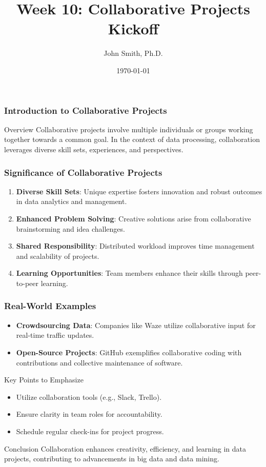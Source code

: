 \documentclass[aspectratio=169]{beamer}
\title[Collaborative Projects]{Week 10: Collaborative Projects Kickoff}
\subtitle{}
\author[J. Smith]{John Smith, Ph.D.}
\institute[University Name]{
  Department of Computer Science\\
  University Name\\
  \vspace{0.3cm}
  Email: email@university.edu\\
  Website: www.university.edu
}
\date{\today}
\begin{document}
\frame{\titlepage}

\begin{frame}[fragile]
    \frametitle{Introduction to Collaborative Projects}
    \begin{block}{Overview}
        Collaborative projects involve multiple individuals or groups working together towards a common goal. In the context of data processing, collaboration leverages diverse skill sets, experiences, and perspectives.
    \end{block}
\end{frame}

\begin{frame}[fragile]
    \frametitle{Significance of Collaborative Projects}
    \begin{enumerate}
        \item \textbf{Diverse Skill Sets}: Unique expertise fosters innovation and robust outcomes in data analytics and management.
        \item \textbf{Enhanced Problem Solving}: Creative solutions arise from collaborative brainstorming and idea challenges.
        \item \textbf{Shared Responsibility}: Distributed workload improves time management and scalability of projects.
        \item \textbf{Learning Opportunities}: Team members enhance their skills through peer-to-peer learning.
    \end{enumerate}
\end{frame}

\begin{frame}[fragile]
    \frametitle{Real-World Examples}
    \begin{itemize}
        \item \textbf{Crowdsourcing Data}: Companies like Waze utilize collaborative input for real-time traffic updates.
        \item \textbf{Open-Source Projects}: GitHub exemplifies collaborative coding with contributions and collective maintenance of software.
    \end{itemize}
    
    \begin{block}{Key Points to Emphasize}
        \begin{itemize}
            \item Utilize collaboration tools (e.g., Slack, Trello).
            \item Ensure clarity in team roles for accountability.
            \item Schedule regular check-ins for project progress.
        \end{itemize}
    \end{block}
    
    \begin{block}{Conclusion}
        Collaboration enhances creativity, efficiency, and learning in data projects, contributing to advancements in big data and data mining.
    \end{block}
\end{frame}
\end{document}
